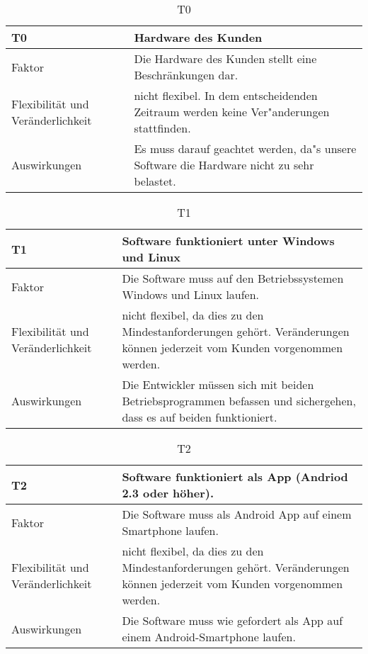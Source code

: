 \begin{table}[H]
\caption{T0}
\begin{tabular}{|p{3cm}|p{12cm}|}\hline
\textbf{T0} & \textbf{Hardware des Kunden} \\ \hline \hline
Faktor & Die Hardware des Kunden stellt eine Beschränkungen dar.\\ \hline
Flexibilität und Veränderlichkeit & nicht flexibel. In dem entscheidenden Zeitraum werden keine Ver"anderungen stattfinden. \\ \hline
Auswirkungen & Es muss darauf geachtet werden, da"s unsere Software die Hardware nicht zu sehr belastet.\\ \hline
\end{tabular}
\end{table}

\begin{table}[H]
\caption{T1}
\begin{tabular}{|p{3cm}|p{12cm}|}\hline
\textbf{T1} & \textbf{Software funktioniert unter Windows und Linux} \\ \hline \hline
Faktor & Die Software muss auf den Betriebssystemen Windows und Linux laufen.\\ \hline
Flexibilität und Veränderlichkeit & nicht flexibel, da dies zu den Mindestanforderungen gehört. Veränderungen können jederzeit vom Kunden vorgenommen werden.  \\ \hline
Auswirkungen & Die Entwickler müssen sich mit beiden Betriebsprogrammen befassen und sichergehen, dass es auf beiden funktioniert.\\ \hline
\end{tabular}
\end{table}


\begin{table}[H]
\caption{T2}
\begin{tabular}{|p{3cm}|p{12cm}|}\hline
\textbf{T2} & \textbf{Software funktioniert als App (Andriod 2.3 oder höher)}. \\ \hline \hline
Faktor & Die Software muss als Android App auf einem Smartphone laufen.\\ \hline
Flexibilität und Veränderlichkeit & nicht flexibel, da dies zu den Mindestanforderungen gehört. Veränderungen können jederzeit vom Kunden vorgenommen werden.  \\ \hline
Auswirkungen & Die Software muss wie gefordert als App auf einem Android-Smartphone laufen.\\ \hline
\end{tabular}
\end{table}


